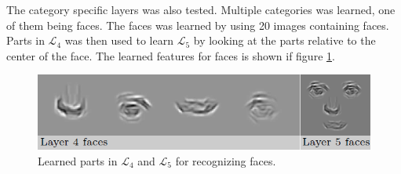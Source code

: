 The category specific layers was also tested. Multiple categories was learned, one of them being faces. 
The faces was learned by using 20 images containing faces. Parts in $\mathcal{L}_{4}$ was then used to learn $\mathcal{L}_{5}$ by  looking at the parts relative to the center of the face. 
The learned features for faces is shown if figure \ref{fig:layer4-5}.

\begin{figure}[h!] %
\centering
\includegraphics[scale=0.7]{graphics/layer4_5_faces}
\caption{Learned parts in $\mathcal{L}_{4}$ and $\mathcal{L}_{5}$ for recognizing faces. 
\cite[fig.~10]{fidler2009learning}}
\label{fig:layer4-5}
\end{figure}

